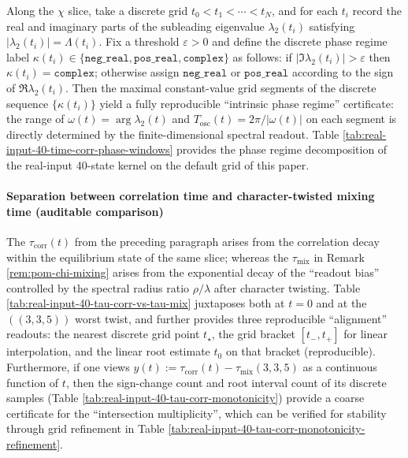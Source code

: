 


\begin{remark}
\label{prop:chi-slice-phase-windows-certificate}
Along the $\chi$ slice, take a discrete grid $t_0<t_1<\cdots<t_N$, and for each $t_i$ record the real and imaginary parts of the subleading eigenvalue $\lambda_2(t_i)$ satisfying $|\lambda_2(t_i)|=\Lambda(t_i)$.
Fix a threshold $\varepsilon>0$ and define the discrete phase regime label
\(
\kappa(t_i)\in\{\texttt{neg\_real},\texttt{pos\_real},\texttt{complex}\}
\)
as follows: if $|\Im\lambda_2(t_i)|>\varepsilon$ then $\kappa(t_i)=\texttt{complex}$; otherwise assign $\texttt{neg\_real}$ or $\texttt{pos\_real}$ according to the sign of $\Re\lambda_2(t_i)$.
Then the maximal constant-value grid segments of the discrete sequence $\{\kappa(t_i)\}$ yield a fully reproducible ``intrinsic phase regime'' certificate: the range of $\omega(t)=\arg\lambda_2(t)$ and $T_{\mathrm{osc}}(t)=2\pi/|\omega(t)|$ on each segment is directly determined by the finite-dimensional spectral readout.
Table \ref{tab:real-input-40-time-corr-phase-windows} provides the phase regime decomposition of the real-input 40-state kernel on the default grid of this paper.
\end{remark}



\paragraph{Separation between correlation time and character-twisted mixing time (auditable comparison)}
The $\tau_{\mathrm{corr}}(t)$ from the preceding paragraph arises from the correlation decay within the equilibrium state of the same slice; whereas the $\tau_{\mathrm{mix}}$ in Remark \ref{rem:pom-chi-mixing} arises from the exponential decay of the ``readout bias'' controlled by the spectral radius ratio $\rho/\lambda$ after character twisting.
Table \ref{tab:real-input-40-tau-corr-vs-tau-mix} juxtaposes both at $t=0$ and at the $((3,3,5))$ worst twist, and further provides three reproducible ``alignment'' readouts: the nearest discrete grid point $t_\star$, the grid bracket $[t_-,t_+]$ for linear interpolation, and the linear root estimate $t_0$ on that bracket (reproducible).
Furthermore, if one views $y(t):=\tau_{\mathrm{corr}}(t)-\tau_{\mathrm{mix}}(3,3,5)$ as a continuous function of $t$, then the sign-change count and root interval count of its discrete samples (Table \ref{tab:real-input-40-tau-corr-monotonicity}) provide a coarse certificate for the ``intersection multiplicity'', which can be verified for stability through grid refinement in Table \ref{tab:real-input-40-tau-corr-monotonicity-refinement}.

